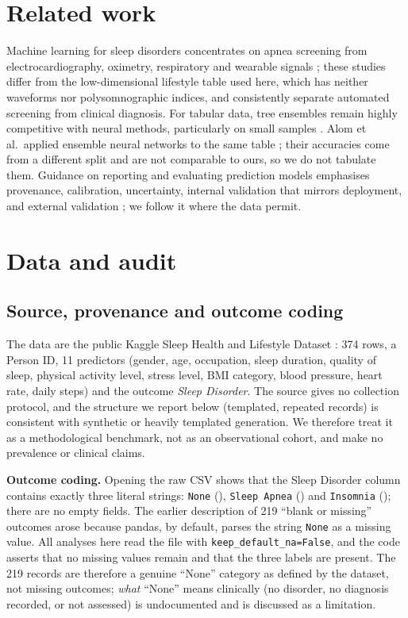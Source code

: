 \documentclass[11pt,a4paper]{article}
\begin{document}
\section{Related work}
Machine learning for sleep disorders concentrates on apnea screening from electrocardiography, oximetry, respiratory and wearable signals \citep{giorgi2025,bazoukis2023,tyagi2023,abdalrazaq2024}; these studies differ from the low-dimensional lifestyle table used here, which has neither waveforms nor polysomnographic indices, and consistently separate automated screening from clinical diagnosis. For tabular data, tree ensembles remain highly competitive with neural methods, particularly on small samples \citep{grinsztajn2022,borisov2024}. Alom et al.\ applied ensemble neural networks to the same table \citep{alom2024}; their accuracies come from a different split and are not comparable to ours, so we do not tabulate them. Guidance on reporting and evaluating prediction models emphasises provenance, calibration, uncertainty, internal validation that mirrors deployment, and external validation \citep{collins2024tripod,collins2024eval,riley2024,lekadir2025}; we follow it where the data permit.

\section{Data and audit}\label{sec:audit}
\subsection{Source, provenance and outcome coding}
The data are the public Kaggle Sleep Health and Lifestyle Dataset \citep{kaggle}: 374 rows, a Person ID, 11 predictors (gender, age, occupation, sleep duration, quality of sleep, physical activity level, stress level, BMI category, blood pressure, heart rate, daily steps) and the outcome \emph{Sleep Disorder}. The source gives no collection protocol, and the structure we report below (templated, repeated records) is consistent with synthetic or heavily templated generation. We therefore treat it as a methodological benchmark, not as an observational cohort, and make no prevalence or clinical claims.

\textbf{Outcome coding.} Opening the raw CSV shows that the Sleep Disorder column contains exactly three literal strings: \texttt{None} (\NNone), \texttt{Sleep Apnea} (\NApn) and \texttt{Insomnia} (\NIns); there are no empty fields. The earlier description of 219 ``blank or missing'' outcomes arose because pandas, by default, parses the string \texttt{None} as a missing value. All analyses here read the file with \texttt{keep\_default\_na=False}, and the code asserts that no missing values remain and that the three labels are present. The 219 records are therefore a genuine ``None'' category as defined by the dataset, not missing outcomes; \emph{what} ``None'' means clinically (no disorder, no diagnosis recorded, or not assessed) is undocumented and is discussed as a limitation.
\end{document}
